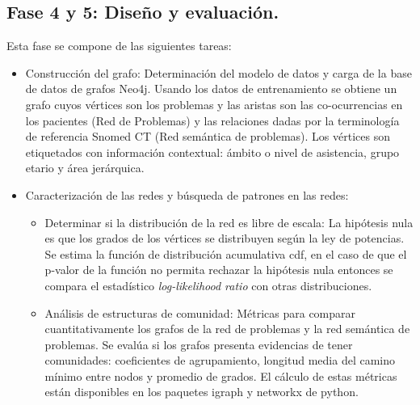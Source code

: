 \subsection{Fase 4 y 5: Diseño y evaluación.} \label{par:disenho_evaluacion} Esta fase se compone de las siguientes tareas:
\begin{itemize}
\item Construcción del grafo: Determinación del modelo de datos y carga de la base de datos de grafos Neo4j. Usando los datos de entrenamiento se obtiene un grafo cuyos vértices son los problemas y las aristas son las co-ocurrencias en los pacientes (Red de Problemas) y las relaciones dadas por la terminología de referencia Snomed CT (Red semántica de problemas). Los vértices son etiquetados con información contextual: ámbito o nivel de asistencia, grupo etario y área jerárquica.  

\item Caracterización de las redes y búsqueda de patrones en las redes:
\begin{itemize}
\item Determinar si la distribución de la red es libre de escala: La hipótesis nula es que los grados de los vértices se distribuyen según la ley de potencias. Se estima la función de distribución acumulativa \acrshort{cdf}, en el caso de que el p-valor de la función no permita rechazar la hipótesis nula entonces se compara el estadístico \textit{log-likelihood ratio} con otras distribuciones.
\item Análisis de estructuras de comunidad: Métricas para comparar cuantitativamente los grafos de la red de problemas y la red semántica de problemas. Se evalúa si los grafos presenta evidencias de tener comunidades: coeficientes de agrupamiento, longitud media del camino mínimo entre nodos y promedio de grados. El cálculo de estas métricas están disponibles en los paquetes igraph\cite{igraph} y networkx\cite{SciPyProceedings_11} de python.
\end{itemize}


\end{itemize}
